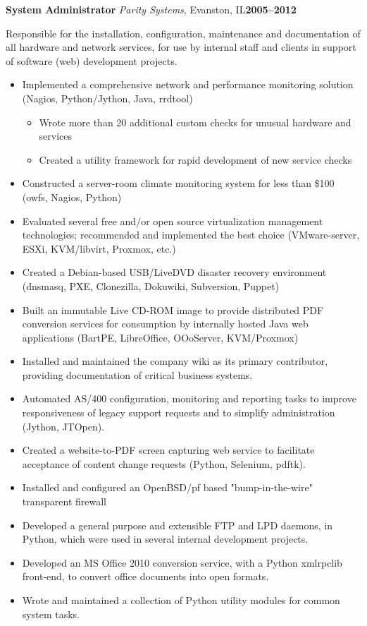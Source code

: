 \documentclass[11pt,letterpaper]{article}
\newcommand{\cventry}[5]{%
{\bfseries{#2}} {\small{\textit{#3}, #4}}\hfill {\small\bfseries{#1}}
\begin{adjustwidth}{1em}{2em}{\raggedright{#5}}\end{adjustwidth}
}
\begin{document}
\cventry{2005--2012}{System Administrator}{Parity Systems}{Evanston, IL}{%
{Responsible for the installation, configuration, maintenance and documentation
of all hardware and network services, for use by internal staff and clients
in support of software (web) development projects.}

\begin{small}
\begin{itemize}
\item Implemented a comprehensive network and performance monitoring solution
      (Nagios, Python/Jython, Java, rrdtool)
      \begin{itemize}
      \item Wrote more than 20 additional custom checks for unusual hardware
            and services
      \item Created a utility framework for rapid development of new service
            checks
      \end{itemize}
\item Constructed a server-room climate monitoring system for less than \$100
      (owfs, Nagios, Python)
\item Evaluated several free and/or open source virtualization management
      technologies; recommended and implemented the best choice (VMware-server,
      ESXi, KVM/libvirt, Proxmox, etc.)
\item Created a Debian-based USB/LiveDVD disaster recovery environment (dnsmasq,
      PXE, Clonezilla, Dokuwiki, Subversion, Puppet)
\item Built an immutable Live CD-ROM image to provide distributed
      PDF conversion services for consumption by internally hosted Java web
      applications (BartPE, LibreOffice, OOoServer, KVM/Proxmox)
\item Installed and maintained the company wiki as its primary contributor,
      providing documentation of critical business systems.
\item Automated AS/400 configuration, monitoring and reporting tasks to
      improve responsiveness of legacy support requests and to simplify
      administration (Jython, JTOpen).
\item Created a website-to-PDF screen capturing web service
      to facilitate acceptance of content change requests (Python, Selenium,
      pdftk).
\item Installed and configured an OpenBSD/pf based "bump-in-the-wire"
      transparent firewall
\item Developed a general purpose and extensible FTP and LPD daemons, in Python,
       which were used in several internal development projects.
\item Developed an MS Office 2010 conversion service, with a Python xmlrpclib
      front-end, to convert office documents into open formats.
\item Wrote and maintained a collection of Python utility modules for common
      system tasks.
\end{itemize}
\end{small}
}
\end{document}
